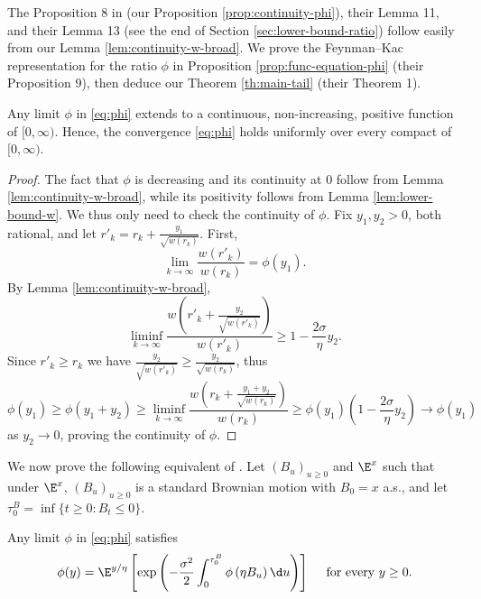 \documentclass[10pt,a4paper]{article}
\begin{document}
The Proposition 8 in \cite{lalley2015maximal} (our Proposition \ref{prop:continuity-phi}), their Lemma 11, and their Lemma 13 (see the end of Section \ref{sec:lower-bound-ratio}) follow easily from our Lemma \ref{lem:continuity-w-broad}. We prove the Feynman--Kac representation for the ratio $\phi$ in Proposition \ref{prop:func-equation-phi} (their Proposition 9), then deduce our Theorem \ref{th:main-tail} (their Theorem 1). 


\begin{proposition}\label{prop:continuity-phi}
Any limit $\phi$ in \eqref{eq:phi} extends to a continuous, non-increasing, positive function of $[0,\infty)$. Hence, the convergence \eqref{eq:phi} holds uniformly over every compact of $[0,\infty)$. 
\end{proposition}

\begin{proof}
The fact that $\phi$ is decreasing and its continuity at $0$ follow from Lemma \ref{lem:continuity-w-broad}, while its positivity follows from Lemma \ref{lem:lower-bound-w}.  
We thus only need to check the continuity of $\phi$. 
Fix $y_1, y_2>0$, both rational, and let $r'_k = r_k + \frac{y_1}{\sqrt{w(r_k)}}$. First, 
\[ \lim_{k\to\infty} \frac{w(r'_k)}{w(r_k)} = \phi(y_1) . \]
By Lemma \ref{lem:continuity-w-broad}, 
\[ \liminf_{k\to\infty} \frac{w\left(r'_k + \frac{y_2}{\sqrt{w(r'_k)}}\right)}{w(r'_k)} \geq 1 - \frac{2\sigma}{\eta} y_2 . \]
Since $r'_k \geq r_k$ we have $\frac{y_2}{\sqrt{w(r'_k)}} \geq \frac{y_2}{\sqrt{w(r_k)}}$, thus 
\[ \phi(y_1) \geq \phi(y_1+y_2) \geq \liminf_{k\to\infty} \frac{w\left(r_k + \frac{y_1+y_2}{\sqrt{w(r_k)}}\right)}{w(r_k)} \geq \phi(y_1) \left(1 - \frac{2\sigma}{\eta} y_2\right) \to \phi(y_1) \]
as $y_2\to 0$, proving the continuity of $\phi$. 
\end{proof}




We now prove the following equivalent of \cite[Proposition 9]{lalley2015maximal}. Let $(B_u)_{u\geq 0}$ and $\E^x$ such that under $\E^x$, $(B_u)_{u\geq 0}$ is a standard Brownian motion with $B_0 = x$ a.s., and let $\tau_0^{B} = \inf\{t\geq 0 : B_t\leq 0\}$.  

\begin{proposition}\label{prop:func-equation-phi}
Any limit $\phi$ in \eqref{eq:phi} satisfies
\begin{equation}
\phi(y) = \E^{y/\eta}\left[ \exp\left(-\frac{\sigma^2}{2} \int_0^{\tau_0^B} \phi\left(\eta B_u\right) \d u \right) \right] \quad \text{ for every } y\geq 0 .
\end{equation}
\end{proposition}
\end{document}
